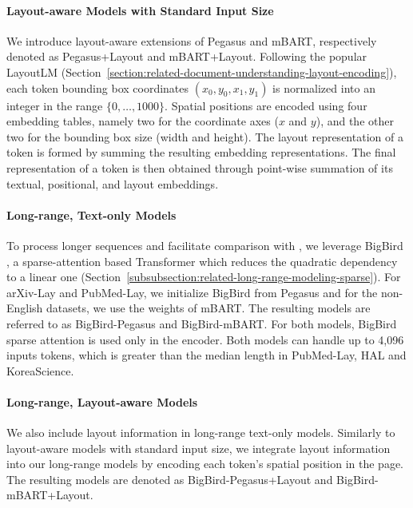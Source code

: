 \paragraph{Layout-aware Models with Standard Input Size}

We introduce layout-aware extensions of Pegasus and mBART, respectively denoted as Pegasus+Layout and mBART+Layout. Following the popular LayoutLM \citep{xu2020layoutlm} (Section~\ref{section:related-document-understanding-layout-encoding}), each token bounding box coordinates $(x_0, y_0, x_1, y_1)$ is normalized into an integer in the range $\{0, \ldots, 1000\}$. Spatial positions are encoded using four embedding tables, namely two for the coordinate axes ($x$ and $y$), and the other two for the bounding box size (width and height). The layout representation of a token is formed by summing the resulting embedding representations. The final representation of a token is then obtained through point-wise summation of its textual, positional, and layout embeddings.

\paragraph{Long-range, Text-only Models}

To process longer sequences and facilitate comparison with \citet{zaheer2020big}, we leverage BigBird \citep{zaheer2020big}, a sparse-attention based Transformer which reduces the quadratic dependency to a linear one (Section~\ref{subsubsection:related-long-range-modeling-sparse}). For arXiv-Lay and PubMed-Lay, we initialize BigBird from Pegasus \citep{zaheer2020big} and for the non-English datasets, we use the weights of mBART. The resulting models are referred to as BigBird-Pegasus and BigBird-mBART. For both models, BigBird sparse attention is used only in the encoder. Both models can handle up to 4,096 inputs tokens, which is greater than the median length in PubMed-Lay, HAL and KoreaScience. 


\paragraph{Long-range, Layout-aware Models}

We also include layout information in long-range text-only models. Similarly to layout-aware models with standard input size, we integrate layout information into our long-range models by encoding each token's spatial position in the page. The resulting models are denoted as BigBird-Pegasus+Layout and BigBird-mBART+Layout.


